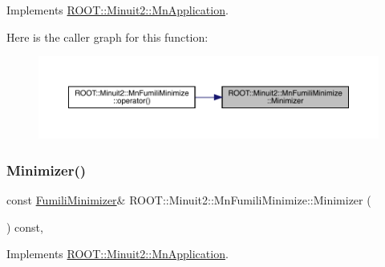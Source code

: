Implements \mbox{\hyperlink{classROOT_1_1Minuit2_1_1MnApplication_a5a8e1e2658b731b5f4023dd1b1594223}{R\+O\+O\+T\+::\+Minuit2\+::\+Mn\+Application}}.

Here is the caller graph for this function\+:\nopagebreak
\begin{figure}[H]
\begin{center}
\leavevmode
\includegraphics[width=350pt]{dc/d88/classROOT_1_1Minuit2_1_1MnFumiliMinimize_a96eb0cf96ae7ec874f912b6d2b3e7990_icgraph}
\end{center}
\end{figure}
\mbox{\label{classROOT_1_1Minuit2_1_1MnFumiliMinimize_a96eb0cf96ae7ec874f912b6d2b3e7990}} 
\subsubsection{\texorpdfstring{Minimizer()}{Minimizer()}\hspace{0.1cm}{\footnotesize\ttfamily [2/2]}}
{\footnotesize\ttfamily const \mbox{\hyperlink{classROOT_1_1Minuit2_1_1FumiliMinimizer}{Fumili\+Minimizer}}\& R\+O\+O\+T\+::\+Minuit2\+::\+Mn\+Fumili\+Minimize\+::\+Minimizer (\begin{DoxyParamCaption}{ }\end{DoxyParamCaption}) const\hspace{0.3cm}{\ttfamily [inline]}, {\ttfamily [virtual]}}



Implements \mbox{\hyperlink{classROOT_1_1Minuit2_1_1MnApplication_a5a8e1e2658b731b5f4023dd1b1594223}{R\+O\+O\+T\+::\+Minuit2\+::\+Mn\+Application}}.

\mbox{\label{classROOT_1_1Minuit2_1_1MnFumiliMinimize_a408e4cc7d16335d7a9bfbb8765acec6d}} 
